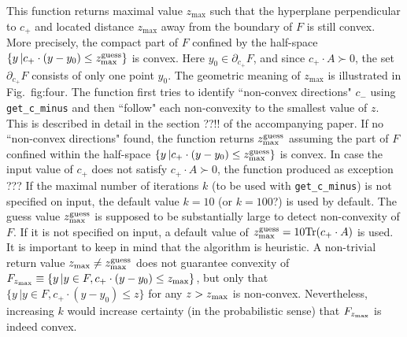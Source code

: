 \documentclass[a4paper]{article}
\theoremstyle{definition}
\begin{document}
\begin{enumerate}
This function returns maximal value $z_{\max}$ such that the hyperplane perpendicular to $c_+$ and located distance $z_{\max}$ away from the boundary of $F$ is still convex. More precisely,  the compact part of $F$ confined by the half-space $\{y\, |c_+ \cdot (y-y_0)\leq z^{\rm guess}_{\rm max}\}$ is convex. Here $y_0\in \partial_{c_+}F$, and since $c_+\cdot A\succ 0$, the set $\partial_{c_+}F$ consists of only one point $y_0$. The geometric meaning of $z_{\max}$ is illustrated in Fig.~{fig:four}. 
The function first tries to identify ``non-convex directions" $c_-$ using {\tt get\_c\_minus} and then ``follow" each non-convexity to the smallest value of $z$. This is described in detail in the section ??!! of the accompanying paper.
If no ``non-convex directions" found, the function returns $z^{\rm guess}_{\rm max}$ assuming the part of $F$ confined within the half-space $\{y\, |c_+ \cdot (y-y_0)\leq z^{\rm guess}_{\rm max}\}$ is convex. 
In case the input value of $c_+$ does not satisfy $c_+\cdot A\succ 0$, the function produced as exception ???
If the maximal number of iterations $k$ (to be used with {\tt get\_c\_minus}) is not specified on input, the default value $k=10$ (or $k=100$?) is used by default. The guess value $z^{\rm guess}_{\rm max}$ is supposed to be substantially large to detect non-convexity of $F$. If it is not specified on input, a default value of $z^{\rm guess}_{\rm max}=10 {\rm Tr}(c_+\cdot A)$ is used.  It is important to keep in mind that the algorithm is heuristic. A non-trivial return value $z_{\max}\neq z^{\rm guess}_{\rm max}$ does not guarantee convexity of  $F_{z_{\rm max}}\equiv \{y\, | y\in F, c_+ \cdot (y-y_0)\leq z_{\rm max}\}$, but only that $\{y\, | y\in F,c_+ \cdot (y-y_0)\leq z\}$ for any $z>z_{\rm max}$ is non-convex. Nevertheless, increasing $k$ would increase certainty (in the probabilistic sense) that $F_{z_{\rm max}}$ is indeed convex. 

\end{enumerate}
\end{document}
